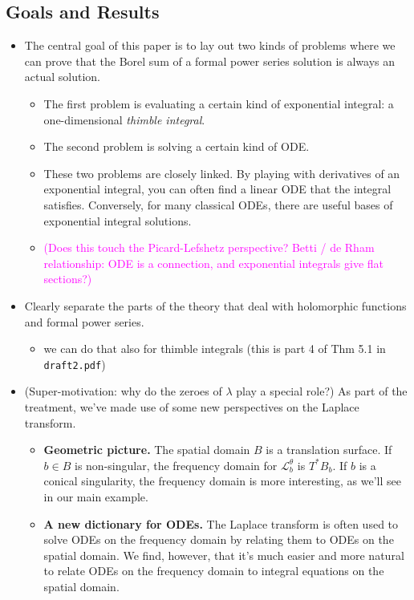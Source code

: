 \documentclass{article}
\newcommand{\laplace}{\mathcal{L}}
\begin{document}
\subsection{Goals and Results}

\color{gray}
\begin{itemize}
\item The central goal of this paper is to lay out two kinds of problems where we can prove that the Borel sum of a formal power series solution is always an actual solution.
\begin{itemize}
\item The first problem is evaluating a certain kind of exponential integral: a one-dimensional {\em thimble integral}.
\item The second problem is solving a certain kind of ODE.
\item These two problems are closely linked. By playing with derivatives of an exponential integral, you can often find a linear ODE that the integral satisfies. Conversely, for many classical ODEs, there are useful bases of exponential integral solutions.
\item \textcolor{magenta}{(Does this touch the Picard-Lefshetz perspective? Betti / de Rham relationship: ODE is a connection, and exponential integrals give flat sections?)}
\end{itemize}
\color{black}
\item Clearly separate the parts of the theory that deal with holomorphic functions and formal power series.
\begin{itemize}
\item we can do that also for thimble integrals (this is part 4 of Thm 5.1 in {\tt draft2.pdf})
\end{itemize}
\item (Super-motivation: why do the zeroes of $\lambda$ play a special role?) As part of the treatment, we've made use of some new perspectives on the Laplace transform.
\begin{itemize}
\item \textbf{Geometric picture.} The spatial domain $B$ is a translation surface. If $b \in B$ is non-singular, the frequency domain for $\laplace_b^\theta$ is $T^* B_b$. If $b$ is a conical singularity, the frequency domain is more interesting, as we'll see in our main example.
\item \textbf{A new dictionary for ODEs.} The Laplace transform is often used to solve ODEs on the frequency domain by relating them to ODEs on the spatial domain. We find, however, that it's much easier and more natural to relate ODEs on the frequency domain to integral equations on the spatial domain. 

\end{itemize}
\end{itemize}
\end{document}
